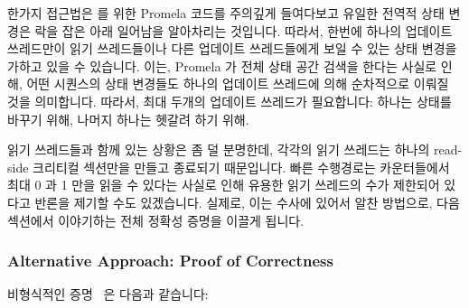 한가지 접근법은  를 위한 Promela 코드를 주의깊게 들여다보고
유일한 전역적 상태 변경은 락을 잡은 아래 일어남을 알아차리는 것입니다.
따라서, 한번에 하나의 업데이트 쓰레드만이 읽기 쓰레드들이나 다른 업데이트
쓰레드들에게 보일 수 있는 상태 변경을 가하고 있을 수 있습니다.
이는, Promela 가 전체 상태 공간 검색을 한다는 사실로 인해, 어떤 시퀀스의 상태
변경들도 하나의 업데이트 쓰레드에 의해 순차적으로 이뤄질 것을 의미합니다.
따라서, 최대 두개의 업데이트 쓰레드가 필요합니다: 하나는 상태를 바꾸기 위해,
나머지 하나는 헷갈려 하기 위해.

읽기 쓰레드들과 함께 있는 상황은 좀 덜 분명한데, 각각의 읽기 쓰레드는 하나의
read-side 크리티컬 섹션만을 만들고 종료되기 때문입니다.
빠른 수행경로는 카운터들에서 최대 0 과 1 만을 읽을 수 있다는 사실로 인해 유용한
읽기 쓰레드의 수가 제한되어 있다고 반론을 제기할 수도 있겠습니다.
실제로, 이는 수사에 있어서 알찬 방법으로, 다음 섹션에서 이야기하는 전체 정확성
증명을 이끌게 됩니다.
\iffalse

One approach is to look carefully at the Promela code for
\co{qrcu_updater()} and notice that the only global state
change is happening under the lock.
Therefore, only one updater at a time can possibly be modifying
state visible to either readers or other updaters.
This means that any sequences of state changes can be carried
out serially by a single updater due to the fact that Promela does a full
state-space search.
Therefore, at most two updaters are required: one to change state
and a second to become confused.

The situation with the readers is less clear-cut, as each reader
does only a single read-side critical section then terminates.
It is possible to argue that the useful number of readers is limited,
due to the fact that the fastpath must see at most a zero and a one
in the counters.
This is a fruitful avenue of investigation, in fact, it leads to
the full proof of correctness described in the next section.
\fi

\subsubsection{Alternative Approach: Proof of Correctness}
\label{sec:formal:Alternative Approach: Proof of Correctness}

비형식적인 증명~\cite{PaulMcKenney2007QRCUpatch} 은 다음과 같습니다:
\iffalse

An informal proof~\cite{PaulMcKenney2007QRCUpatch}
follows:
\fi

